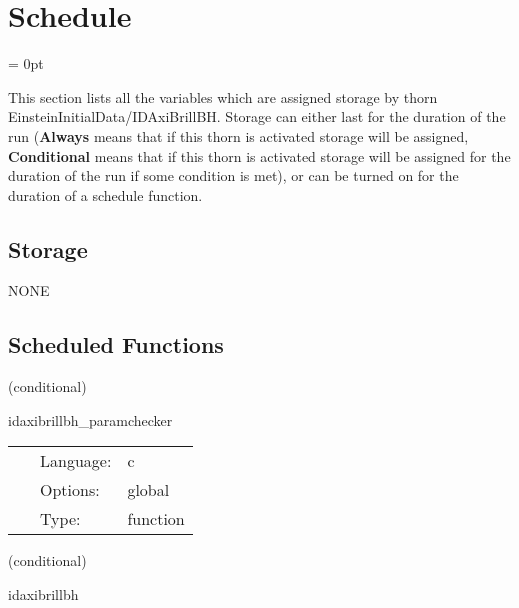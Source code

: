 
\section{Schedule} 


\parskip = 0pt


\noindent This section lists all the variables which are assigned storage by thorn EinsteinInitialData/IDAxiBrillBH.  Storage can either last for the duration of the run ({\bf Always} means that if this thorn is activated storage will be assigned, {\bf Conditional} means that if this thorn is activated storage will be assigned for the duration of the run if some condition is met), or can be turned on for the duration of a schedule function.


\subsection*{Storage}NONE
\subsection*{Scheduled Functions}
\vspace{5mm}

   (conditional) 

\hspace{5mm} idaxibrillbh\_paramchecker 

\hspace{5mm}{\it check that the metric\_type is recognised } 


\hspace{5mm}

 \begin{tabular*}{160mm}{cll} 
~ & Language:  & c \\ 
~ & Options:  & global \\ 
~ & Type:  & function \\ 
\end{tabular*} 


\vspace{5mm}

   (conditional) 

\hspace{5mm} idaxibrillbh 

\hspace{5mm}{\it construct idaxibrillbh } 


\hspace{5mm}

